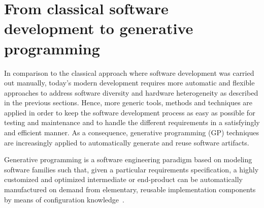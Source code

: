 
 










\section{From classical software development to generative programming}
\label{sec:FROM} 
In comparison to the classical approach where software development was carried out manually, today’s modern development requires more automatic and flexible approaches to address software diversity and hardware heterogeneity as described in the previous sections.
Hence, more generic tools, methods and techniques are applied in order to keep the software development process as easy as possible for testing and maintenance and to handle the different requirements in a satisfyingly and efficient manner.
As a consequence, generative programming (GP) techniques are increasingly applied to automatically generate and reuse software artifacts.
\begin{mydef}
		Generative programming is a software engineering paradigm based on modeling software families such that, given a particular requirements specification, a highly customized and optimized intermediate or end-product can be automatically manufactured on demand from elementary, reusable implementation components by means of configuration knowledge~\cite{Czarnecki:2000:GPM:345203}.
\end{mydef}

